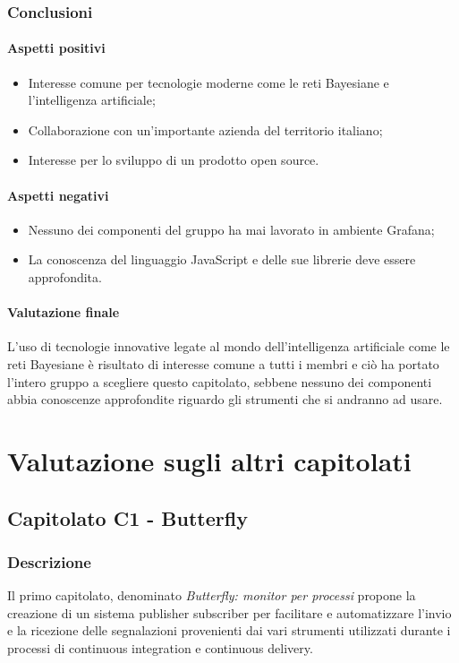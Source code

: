 	\subsubsection{Conclusioni}
		\paragraph{Aspetti positivi}
		\begin{itemize}
			\item{Interesse comune per tecnologie moderne come le reti Bayesiane e l'intelligenza artificiale;}
			\item{Collaborazione con un'importante azienda del territorio italiano;}
			\item{Interesse per lo sviluppo di un prodotto open source.}
		\end{itemize}
		\paragraph{Aspetti negativi}	
		\begin{itemize}
			\item{Nessuno dei componenti del gruppo ha mai lavorato in ambiente Grafana;}
			\item{La conoscenza del linguaggio JavaScript e delle sue librerie deve essere approfondita.}
		\end{itemize} 
		\paragraph{Valutazione finale} \Spazio
		L'uso di tecnologie innovative legate al mondo dell'intelligenza artificiale come le reti Bayesiane è risultato di interesse comune a tutti i membri e ciò ha portato l'intero gruppo a scegliere questo capitolato, sebbene nessuno dei componenti abbia conoscenze approfondite riguardo gli strumenti che si andranno ad usare.  
				
		 
\section{Valutazione sugli altri capitolati}
	\subsection{Capitolato C1 - Butterfly}
		\subsubsection{Descrizione}
	    Il primo capitolato, denominato \emph{Butterfly: monitor per processi } propone la creazione di un sistema publisher subscriber per facilitare e automatizzare l'invio e la ricezione delle segnalazioni provenienti dai vari strumenti utilizzati durante i processi di continuous integration e continuous delivery.
